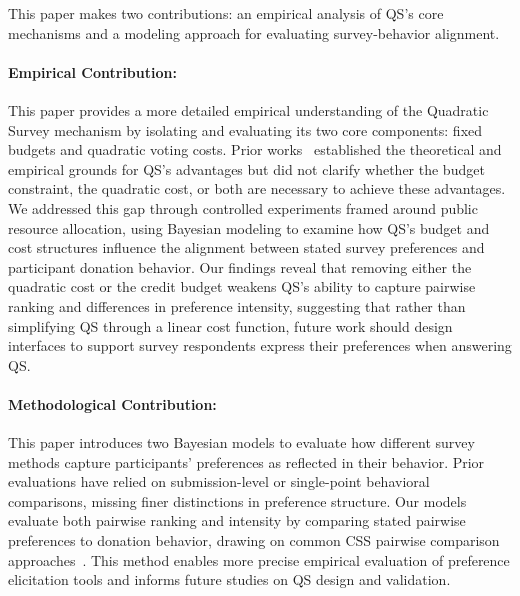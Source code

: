 
This paper makes two contributions: an empirical analysis of QS's core mechanisms and a modeling approach for evaluating survey-behavior alignment.

\paragraph{Empirical Contribution: } 
This paper provides a more detailed empirical understanding of the Quadratic Survey mechanism by isolating and evaluating its two core components: fixed budgets and quadratic voting costs. Prior works~\cite{georgescuFixedbudgetMultipleissueQuadratic2024, eguia2019quadratic, quarfoot2017quadratic, chengCanShowWhat2021} established the theoretical and empirical grounds for QS's advantages but did not clarify whether the budget constraint, the quadratic cost, or both are necessary to achieve these advantages. We addressed this gap through controlled experiments framed around public resource allocation, using Bayesian modeling to examine how QS's budget and cost structures influence the alignment between stated survey preferences and participant donation behavior. Our findings reveal that removing either the quadratic cost or the credit budget weakens QS's ability to capture pairwise ranking and differences in preference intensity, suggesting that rather than simplifying QS through a linear cost function, future work should design interfaces to support survey respondents express their preferences when answering QS.

\paragraph{Methodological Contribution:}
This paper introduces two Bayesian models to evaluate how different survey methods capture participants' preferences as reflected in their behavior. Prior evaluations have relied on submission-level or single-point behavioral comparisons, missing finer distinctions in preference structure. Our models evaluate both pairwise ranking and intensity by comparing stated pairwise preferences to donation behavior, drawing on common CSS pairwise comparison approaches~\cite{collewet2023preference, hauserIntensityMeasuresConsumer1980a}. This method enables more precise empirical evaluation of preference elicitation tools and informs future studies on QS design and validation.


